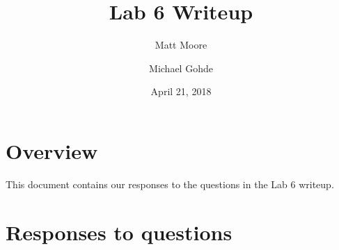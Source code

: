 \documentclass[12pt,letterpaper]{article}
\begin{document}
\title{Lab 6 Writeup}
\author{Matt Moore\\
\and
Michael Gohde\\}
\date{April 21, 2018}
\maketitle

\section{Overview}
This document contains our responses to the questions in the Lab 6 writeup.

\section{Responses to questions}
\end{document}
